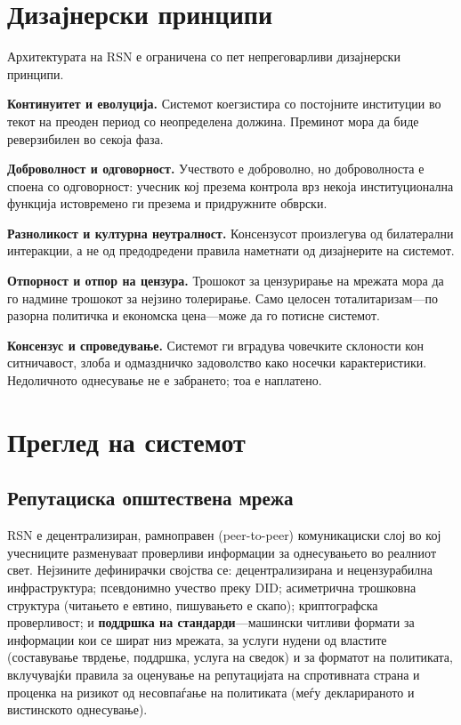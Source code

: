 \documentclass[11pt,a4paper,twocolumn]{article}
\begin{document}
\section{Дизајнерски принципи}

Архитектурата на RSN е ограничена со пет непреговарливи дизајнерски принципи.

\textbf{Континуитет и еволуција.} Системот коегзистира со постојните институции во текот на преоден период со неопределена должина. Преминот мора да биде реверзибилен во секоја фаза.

\textbf{Доброволност и одговорност.} Учеството е доброволно, но доброволноста е споена со одговорност: учесник кој презема контрола врз некоја институционална функција истовремено ги презема и придружните обврски.

\textbf{Разноликост и културна неутралност.} Консензусот произлегува од билатерални интеракции, а не од предодредени правила наметнати од дизајнерите на системот.

\textbf{Отпорност и отпор на цензура.} Трошокот за цензурирање на мрежата мора да го надмине трошокот за нејзино толерирање. Само целосен тоталитаризам---по разорна политичка и економска цена---може да го потисне системот.

\textbf{Консензус и спроведување.} Системот ги вградува човечките склоности кон ситничавост, злоба и одмаздничко задоволство како носечки карактеристики. Недоличното однесување не е забрането; тоа е наплатено.

\section{Преглед на системот}

\subsection{Репутациска општествена мрежа}

RSN е децентрализиран, рамноправен (peer-to-peer) комуникациски слој во кој учесниците разменуваат проверливи информации за однесувањето во реалниот свет. Нејзините дефинирачки својства се: децентрализирана и нецензурабилна инфраструктура; псевдонимно учество преку DID; асиметрична трошковна структура (читањето е евтино, пишувањето е скапо); криптографска проверливост; и \textbf{поддршка на стандарди}---машински читливи формати за информации кои се шират низ мрежата, за услуги нудени од властите (составување тврдење, поддршка, услуга на сведок) и за форматот на политиката, вклучувајќи правила за оценување на репутацијата на спротивната страна и проценка на ризикот од несовпаѓање на политиката (меѓу декларираното и вистинското однесување).
\end{document}
